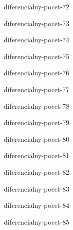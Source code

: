 \begin{defproblem}{diferencialny-pocet-72}

\end{defproblem}

\begin{defproblem}{diferencialny-pocet-73}

\end{defproblem}

\begin{defproblem}{diferencialny-pocet-74}

\end{defproblem}

\begin{defproblem}{diferencialny-pocet-75}

\end{defproblem}

\begin{defproblem}{diferencialny-pocet-76}

\end{defproblem}

\begin{defproblem}{diferencialny-pocet-77}

\end{defproblem}

\begin{defproblem}{diferencialny-pocet-78}

\end{defproblem}

\begin{defproblem}{diferencialny-pocet-79}

\end{defproblem}

\begin{defproblem}{diferencialny-pocet-80}

\end{defproblem}

\begin{defproblem}{diferencialny-pocet-81}

\end{defproblem}

\begin{defproblem}{diferencialny-pocet-82}

\end{defproblem}

\begin{defproblem}{diferencialny-pocet-83}

\end{defproblem}

\begin{defproblem}{diferencialny-pocet-84}

\end{defproblem}

\begin{defproblem}{diferencialny-pocet-85}

\end{defproblem}